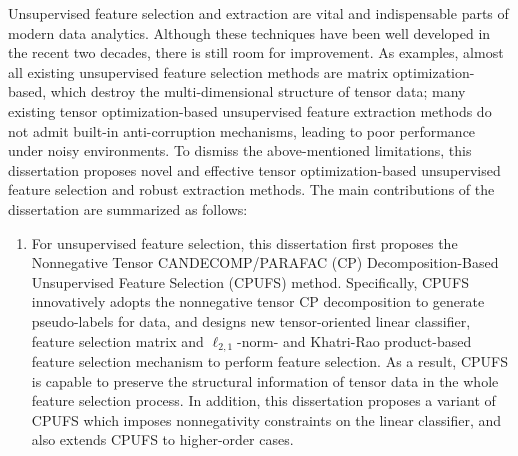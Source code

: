 \begin{eabstract}
Unsupervised feature selection and extraction are vital and indispensable parts of modern data analytics. Although these techniques have been well developed in the recent two decades, there is still room for improvement. As examples, almost all existing unsupervised feature selection methods are matrix optimization-based, which destroy the multi-dimensional structure of tensor data; many existing tensor optimization-based unsupervised feature extraction methods do not admit built-in anti-corruption mechanisms, leading to poor performance under noisy environments. To dismiss the above-mentioned limitations, this dissertation proposes novel and effective tensor optimization-based unsupervised feature selection and robust extraction methods. The main contributions of the dissertation are summarized as follows:
\begin{enumerate}[wide]
    \item For unsupervised feature selection, this dissertation first proposes the Nonnegative Tensor CANDECOMP/PARAFAC (CP) Decomposition-Based Unsupervised Feature Selection (CPUFS) method. Specifically, CPUFS innovatively adopts the nonnegative tensor CP decomposition to generate pseudo-labels for data, and designs new tensor-oriented linear classifier, feature selection matrix and $\ell_{2,1}$-norm- and Khatri-Rao product-based feature selection mechanism to perform feature selection.
    As a result, CPUFS is capable to preserve the structural information of tensor data in the whole feature selection process. 
    In addition, this dissertation proposes a variant of CPUFS which imposes nonnegativity constraints on the linear classifier, and also extends CPUFS to higher-order cases.
    

\end{enumerate}
\end{eabstract}

